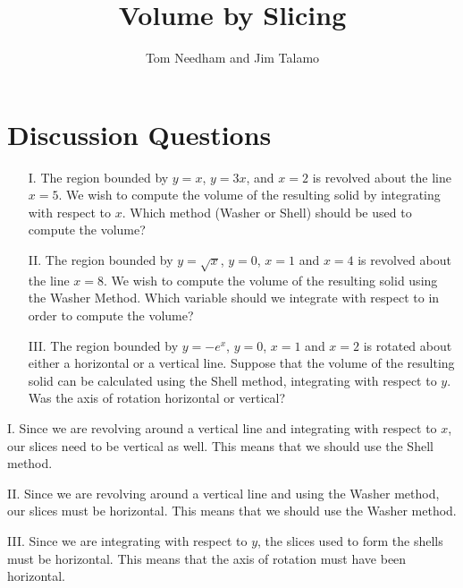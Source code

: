\documentclass[]{ximera}
\author{Tom Needham and Jim Talamo}
\title[]{Volume by Slicing}
\begin{document}
\begin{abstract}
\end{abstract}
\maketitle

\vspace{-0.9in}

\section{Discussion Questions}

\begin{problem}
\begin{enumerate}
\item[I.] The region bounded by $y=x$, $y=3x$, and $x=2$ is revolved about the line $x=5$. We wish to compute the volume of the resulting solid by integrating with respect to $x$. Which method (Washer or Shell) should be used to compute the volume?

\item[II.]  The region bounded by $y=\sqrt{x}$, $y=0$, $x=1$ and $x=4$ is revolved about the line $x=8$.  We wish to compute the volume of the resulting solid using the Washer Method. Which variable should we integrate with respect to in order to compute the volume?

\item[III.] The region bounded by $y=-e^x$, $y=0$, $x=1$ and $x=2$ is rotated about either a horizontal or a vertical line. Suppose that the volume of the resulting solid can be calculated using the Shell method, integrating with respect to $y$. Was the axis of rotation horizontal or vertical?
\end{enumerate}
\end{problem}

\begin{freeResponse}
I. Since we are revolving around a vertical line and integrating with respect to $x$, our slices need to be vertical as well. This means that we should use the Shell method.

II. Since we are revolving around a vertical line and using the Washer method, our slices must be horizontal. This means that we should use the Washer method.

III. Since we are integrating with respect to $y$, the slices used to form the shells must be horizontal. This means that the axis of rotation must have been horizontal.
\end{freeResponse}
\end{document}

